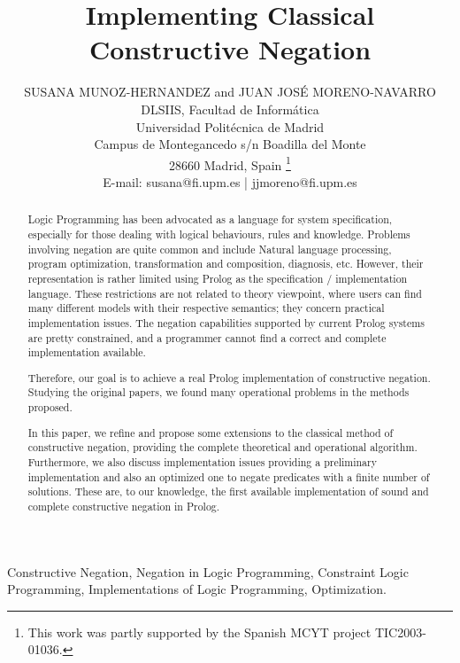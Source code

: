 \documentclass{tlp}
\begin{document}


\long{}


\title{Implementing Classical Constructive Negation}

\author[S. Munoz-Hernandez and J.J. Moreno-Navarro]
{SUSANA MUNOZ-HERNANDEZ and JUAN JOS\'{E} MORENO-NAVARRO \\
DLSIIS, Facultad de Inform\'{a}tica \\
Universidad Polit\'{e}cnica de  Madrid \\ 
Campus de Montegancedo s/n Boadilla del Monte\\
28660 Madrid, Spain \footnote{This work was partly supported by the
Spanish MCYT project TIC2003-01036.} \\
E-mail: susana@fi.upm.es | jjmoreno@fi.upm.es
}

\pagerange{\pageref{firstpage}--\pageref{lastpage}}
\setcounter{page}{1}

\maketitle

\label{firstpage}

\begin{abstract}
%
  Logic Programming has been advocated as a language for system specification,
  especially for those dealing with logical behaviours, rules and
  knowledge. Problems involving negation are quite common and include
  Natural language processing, program optimization, transformation
  and composition, diagnosis, etc. However, their
  representation is rather limited using Prolog as the specification /
  implementation language. These restrictions are not related to theory
  viewpoint, where users can find many different models with their respective
  semantics; they concern practical implementation issues. The negation
  capabilities supported by current Prolog systems are pretty constrained, and
  a programmer cannot find a correct and complete implementation available.

  Therefore, our goal is to achieve a real Prolog implementation of
  constructive negation. Studying the original papers, we found many operational problems in the
  methods proposed.
 
In this paper, we refine and propose some extensions to the classical method
  of constructive negation, providing the complete theoretical and operational
  algorithm. Furthermore, we also discuss implementation issues providing a
  preliminary implementation and also an optimized one to negate predicates
  with a finite number of solutions. These are, to our knowledge, the first
  available implementation of sound and complete constructive negation in Prolog.
\end{abstract}
\begin{keywords}
Constructive Negation, Negation in Logic Programming, Constraint Logic
Programming, Implementations of Logic Programming, Optimization.
\end{keywords}
\end{document}
